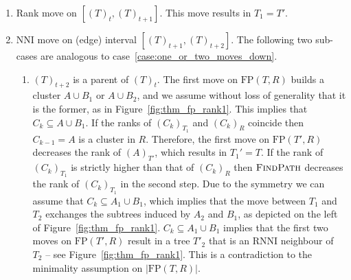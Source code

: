\documentclass[11pt]{amsart}
\newcommand{\rnni}{\mathrm{RNNI}}
\newcommand{\findpath}{\textsc{FindPath}}
\newcommand{\nni}{\mathrm{NNI}}
\newcommand{\fp}{\mathrm{FP}}
\begin{document}
\begin{enumerate}[label = 2.\arabic*]
\item Rank move on $[(T)_t,(T)_{t+1}]$.
This move results in $T_1 = T'$.

\item $\nni$ move on (edge) interval $[(T)_{t+1},(T)_{t+2}]$.
The following two sub-cases are analogous to case~\ref{case:one_or_two_moves_down}.

\begin{enumerate}[label = \theenumi.\arabic*]
\item $(T)_{t+2}$ is a parent of $(T)_t$.
The first move on $\fp(T, R)$ builds a cluster $A \cup B_1$ or $A \cup B_2$, and we assume without loss of generality that it is the former, as in Figure~\ref{fig:thm_fp_rank1}.
This implies that $C_k \subseteq A \cup B_1$.
If the ranks of $(C_k)_{T_1}$ and $(C_k)_R$ coincide then $C_{k-1} = A$ is a cluster in $R$.
Therefore, the first move on $\fp(T', R)$ decreases the rank of $(A)_{T'}$, which results in $T_1' = T$.
If the rank of $(C_k)_{T_1}$ is strictly higher than that of $(C_k)_R$ then $\findpath$ decreases the rank of $(C_k)_{T_1}$ in the second step.
Due to the symmetry we can assume that $C_k \subseteq A_1 \cup B_1$, which implies that the move between $T_1$ and $T_2$ exchanges the subtrees induced by $A_2$ and $B_1$, as depicted on the left of Figure~\ref{fig:thm_fp_rank1}.
$C_k \subseteq A_1 \cup B_1$ implies that the first two moves on $\fp(T', R)$ result in a tree $T'_2$ that is an $\rnni$ neighbour of $T_2$ -- see Figure~\ref{fig:thm_fp_rank1}.
This is a contradiction to the minimality assumption on $|\fp(T,R)|$.


\end{enumerate}
\end{enumerate}
\end{document}
